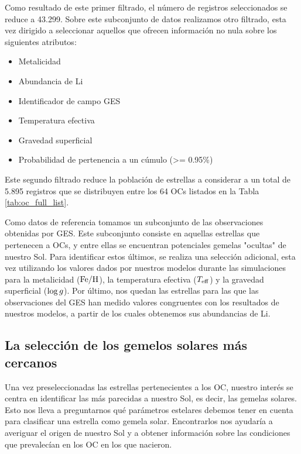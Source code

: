 Como resultado de este primer filtrado, el número de registros seleccionados se reduce a 43.299. Sobre este subconjunto de datos realizamos otro filtrado, esta vez dirigido a seleccionar aquellos que ofrecen información no nula sobre los siguientes atributos:
\begin{itemize}
	\item Metalicidad
	\item Abundancia de Li
	\item Identificador de campo GES
	\item Temperatura efectiva
	\item Gravedad superficial
	\item Probabilidad de pertenencia a un cúmulo (>= 0.95\%)
\end{itemize}

Este segundo filtrado reduce la población de estrellas a considerar a un total de 5.895 registros que se distribuyen entre los 64 OCs listados en la Tabla \ref{tab:oc_full_list}.\par

Como datos de referencia tomamos un subconjunto de las observaciones obtenidas por GES. Este subconjunto consiste en aquellas estrellas que pertenecen a OCs, y entre ellas se encuentran potenciales gemelas "ocultas" de nuestro Sol. Para identificar estos últimos, se realiza una selección adicional, esta vez utilizando los valores dados por nuestros modelos durante las simulaciones para la metalicidad ($\mathrm{Fe}/\mathrm{H}$), la temperatura efectiva ($T_{\mathrm{eff}}$) y la gravedad superficial ($\mathrm{log} \, g$). Por último, nos quedan las estrellas para las que las observaciones del GES han medido valores congruentes con los resultados de nuestros modelos, a partir de los cuales obtenemos sus abundancias de Li.\par

\subsection{La selección de los gemelos solares más cercanos}
Una vez preseleccionadas las estrellas pertenecientes a los OC, nuestro interés se centra en identificar las más parecidas a nuestro Sol, es decir, las gemelas solares. Esto nos lleva a preguntarnos qué parámetros estelares debemos tener en cuenta para clasificar una estrella como gemela solar. Encontrarlos nos ayudaría a averiguar el origen de nuestro Sol y a obtener información sobre las condiciones que prevalecían en los OC en los que nacieron.\par

